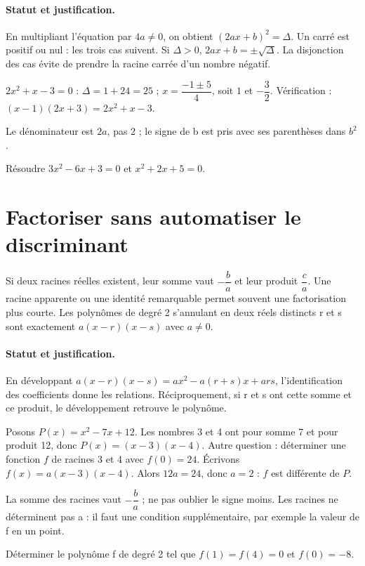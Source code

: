 \paragraph{Statut et justification.} En multipliant l’équation par $4a\ne0$, on obtient $(2ax+b)^2=\Delta$. Un carré est positif ou nul : les trois cas suivent. Si $\Delta>0$, $2ax+b=\pm\sqrt\Delta$. La disjonction des cas évite de prendre la racine carrée d’un nombre négatif.
\begin{example}$2x^2+x-3=0$ : $\Delta=1+24=25$ ; $x=\dfrac{-1\pm5}{4}$, soit $1$ et $-\dfrac{3}{2}$. Vérification : $(x-1)(2x+3)=2x^2+x-3$.\end{example}\label{C02-EX2}
\begin{pitfall}Le dénominateur est $2a$, pas 2 ; le signe de b est pris avec ses parenthèses dans $b^2$.\end{pitfall}
\begin{application}Résoudre $3x^2-6x+3=0$ et $x^2+2x+5=0$.\end{application}\label{C02-AP2}
\section{Factoriser sans automatiser le discriminant}\label{C02-U3}
\begin{keypoint}
Si deux racines réelles existent, leur somme vaut $-\dfrac{b}{a}$ et leur produit $\dfrac{c}{a}$. Une racine apparente ou une identité remarquable permet souvent une factorisation plus courte. Les polynômes de degré 2 s’annulant en deux réels distincts r et s sont exactement $a(x-r)(x-s)$ avec $a\ne0$.
\end{keypoint}
\paragraph{Statut et justification.} En développant $a(x-r)(x-s)=ax^2-a(r+s)x+ars$, l’identification des coefficients donne les relations. Réciproquement, si r et s ont cette somme et ce produit, le développement retrouve le polynôme.
\begin{example}Posons $P(x)=x^2-7x+12$. Les nombres 3 et 4 ont pour somme 7 et pour produit 12, donc $P(x)=(x-3)(x-4)$. Autre question : déterminer une fonction $f$ de racines 3 et 4 avec $f(0)=24$. Écrivons $f(x)=a(x-3)(x-4)$. Alors $12a=24$, donc $a=2$ : $f$ est différente de $P$.\end{example}\label{C02-EX3}
\begin{pitfall}La somme des racines vaut $-\dfrac{b}{a}$ ; ne pas oublier le signe moins. Les racines ne déterminent pas a : il faut une condition supplémentaire, par exemple la valeur de f en un point.\end{pitfall}
\begin{application}Déterminer le polynôme f de degré 2 tel que $f(1)=f(4)=0$ et $f(0)=-8$.\end{application}\label{C02-AP3}
